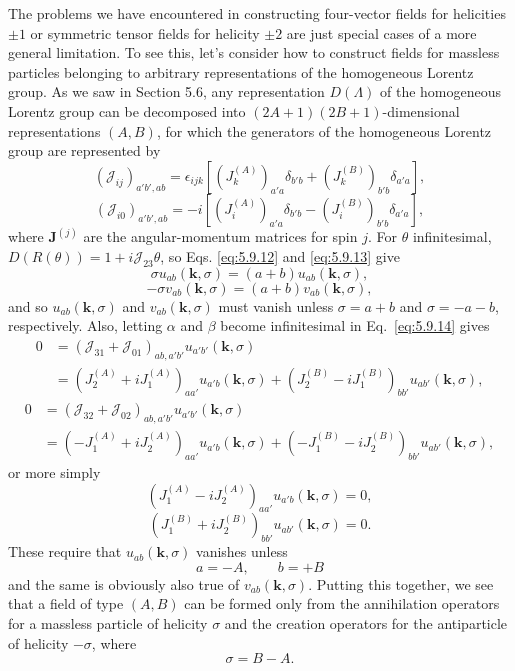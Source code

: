 The problems we have encountered in constructing four-vector fields for
helicities $\pm1$ or symmetric tensor fields for helicity $\pm2$ are just
special cases of a more general limitation. To see this, let's consider how to
construct fields for massless particles belonging to arbitrary representations
of the homogeneous Lorentz group. As we saw in Section 5.6, any representation
$D(\Lambda)$ of the homogeneous Lorentz group can be decomposed into
$(2A+1)(2B+1)$-dimensional representations $(A,B)$, for which the generators
of the homogeneous Lorentz group are represented by
\[
(\mathcal J_{ij})_{a'b',ab}=\epsilon_{ijk}
[(J_k^{(A)})_{a'a}\delta_{b'b}+(J_k^{(B)})_{b'b}\delta_{a'a}],
\]
\[
(\mathcal J_{i0})_{a'b',ab}=-i
[(J_i^{(A)})_{a'a}\delta_{b'b}-(J_i^{(B)})_{b'b}\delta_{a'a}],
\]
where $\mathbf J^{(j)}$ are the angular-momentum matrices for spin $j$. For
$\theta$ infinitesimal, $D(R(\theta))=1+i\mathcal J_{23}\theta$, so Eqs.
\eqref{eq:5.9.12} and \eqref{eq:5.9.13} give
\[
\sigma u_{ab}(\mathbf k,\sigma)=(a+b)u_{ab}(\mathbf k,\sigma),
\]
\[
-\sigma v_{ab}(\mathbf k,\sigma)=(a+b)v_{ab}(\mathbf k,\sigma),
\]
and so $u_{ab}(\mathbf k,\sigma)$ and $v_{ab}(\mathbf k,\sigma)$ must vanish
unless $\sigma=a+b$ and $\sigma=-a-b$, respectively. Also, letting $\alpha$
and $\beta$ become infinitesimal in Eq.~\eqref{eq:5.9.14} gives
\begin{align*}
0&=(\mathcal J_{31}+\mathcal J_{01})_{ab,a'b'}
u_{a'b'}(\mathbf k,\sigma)\\
&=(J_2^{(A)}+iJ_1^{(A)})_{aa'}u_{a'b}(\mathbf k,\sigma)
+(J_2^{(B)}-iJ_1^{(B)})_{bb'}u_{ab'}(\mathbf k,\sigma),
\end{align*}
\begin{align*}
0&=(\mathcal J_{32}+\mathcal J_{02})_{ab,a'b'}
u_{a'b'}(\mathbf k,\sigma)\\
&=(-J_1^{(A)}+iJ_2^{(A)})_{aa'}u_{a'b}(\mathbf k,\sigma)
+(-J_1^{(B)}-iJ_2^{(B)})_{bb'}u_{ab'}(\mathbf k,\sigma),
\end{align*}
or more simply
\[
(J_1^{(A)}-iJ_2^{(A)})_{aa'}u_{a'b}(\mathbf k,\sigma)=0,
\]
\[
(J_1^{(B)}+iJ_2^{(B)})_{bb'}u_{ab'}(\mathbf k,\sigma)=0.
\]
These require that $u_{ab}(\mathbf k,\sigma)$ vanishes unless
\begin{equation}
a=-A,\qquad b=+B
\tag{5.9.40}\label{eq:5.9.40}
\end{equation}
and the same is obviously also true of $v_{ab}(\mathbf k,\sigma)$. Putting this
together, we see that a field of type $(A,B)$ can be formed only from the
annihilation operators for a massless particle of helicity $\sigma$ and the
creation operators for the antiparticle of helicity $-\sigma$, where
\begin{equation}
\sigma=B-A.
\tag{5.9.41}\label{eq:5.9.41}
\end{equation}

